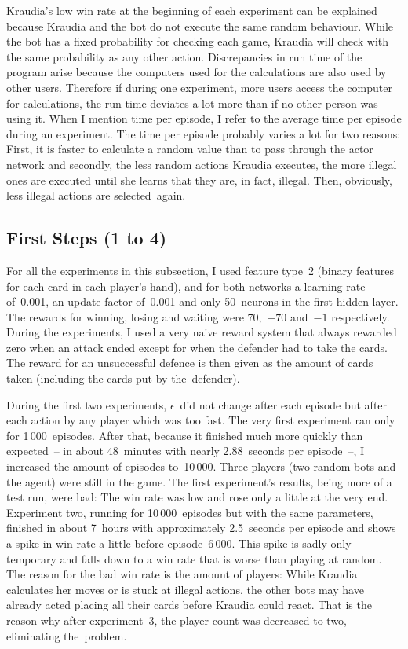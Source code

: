 \documentclass[a4paper,titlepage]{article}
\begin{document}
Kraudia's low win rate at the beginning of each experiment can be explained because Kraudia and the bot do not execute the same random behaviour. While the bot has a fixed probability for checking each game, Kraudia will check with the same probability as any other action. Discrepancies in run time of the program arise because the computers used for the calculations are also used by other users. Therefore if during one experiment, more users access the computer for calculations, the run time deviates a lot more than if no other person was using it. When I mention time per episode, I refer to the average time per episode during an experiment. The time per episode probably varies a lot for two reasons: First, it is faster to calculate a random value than to pass through the actor network and secondly, the less random actions Kraudia executes, the more illegal ones are executed until she learns that they are, in fact, illegal. Then, obviously, less illegal actions are selected~again.

\subsection{First Steps (1 to 4)}

For all the experiments in this subsection, I used feature type~2 (binary features for each card in each player's hand), and for both networks a learning rate of~0.001, an update factor of~0.001 and only 50~neurons in the first hidden layer. The rewards for winning, losing and waiting were 70,~$-70$ and~$-1$ respectively. During the experiments, I used a very naive reward system that always rewarded zero when an attack ended except for when the defender had to take the cards. The reward for an unsuccessful defence is then given as the amount of cards taken (including the cards put by the~defender).

During the first two experiments, $\epsilon$~did not change after each episode but after each action by any player which was too fast.
The very first experiment ran only for 1\,000~episodes. After that, because it finished much more quickly than expected~-- in about 48~minutes with nearly 2.88~seconds per episode~--, I increased the amount of episodes to~10\,000.
Three players (two random bots and the agent) were still in the game. The first experiment's results, being more of a test run, were bad: The win rate was low and rose only a little at the very end. Experiment two, running for 10\,000~episodes but with the same parameters, finished in about 7~hours with approximately 2.5~seconds per episode and shows a spike in win rate a little before episode~6\,000. This spike is sadly only temporary and falls down to a win rate that is worse than playing at random. The reason for the bad win rate is the amount of players: While Kraudia calculates her moves or is stuck at illegal actions, the other bots may have already acted placing all their cards before Kraudia could react. That is the reason why after experiment~3, the player count was decreased to two, eliminating the~problem.
\end{document}
